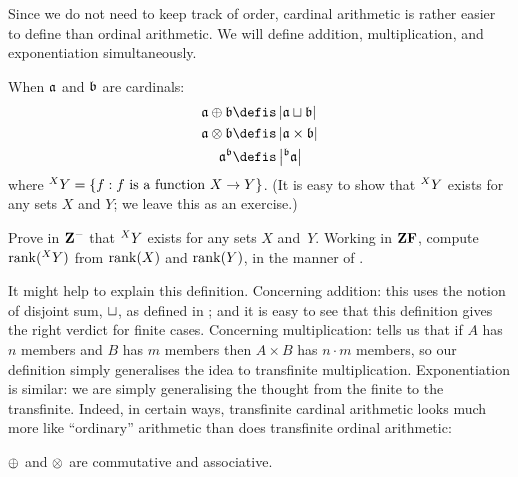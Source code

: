 \documentclass[../../../include/open-logic-section]{subfiles}
\begin{document}

Since we do not need to keep track of order, cardinal arithmetic is
rather easier to define than ordinal arithmetic. We will define
addition, multiplication, and exponentiation simultaneously. 

\begin{defn}
When $\mathfrak{a}$ and $\mathfrak{b}$ are cardinals:
\begin{align*}
	\cardfont{a} \cardplus \cardfont{b} &\defis 
	\card{\cardfont{a} \disjointsum \cardfont{b}}\\
	\cardfont{a} \cardtimes \cardfont{b} &\defis 
	\card{\cardfont{a} \times \cardfont{b}}\\
	\cardexpo{\cardfont{a}}{\cardfont{b}} &\defis 
	\card{\funfromto{\cardfont{b}}{\cardfont{a}}}
\end{align*}
where ${}^{X}{Y} = \{ f : f \text{ is a function } X \to Y \}$.
(It is easy to show that ${}^{X}{Y}$ exists for any sets $X$
and $Y$; we leave this as an exercise.) 
\end{defn}

\begin{prob}
Prove in $\mathbf{Z}^{-}$ that ${}^{X}{Y}$ exists for any sets $X$
and~$Y$. Working in $\mathbf{ZF}$, compute $\mathrm{rank}({}^{X}{Y})$ from
$\mathrm{rank}(X)$ and $\mathrm{rank}(Y)$, in the manner of
. 
\end{prob}

It might help to explain this definition. Concerning addition: this
uses the notion of disjoint sum, $\sqcup$, as defined in
; and it is easy
to see that this definition gives the right verdict for finite cases.
Concerning multiplication:  tells us
that if $A$ has $n$ members and $B$ has $m$ members then $A \times B$
has $n \cdot m$ members, so our definition simply generalises the idea
to transfinite multiplication. Exponentiation is similar: we are
simply generalising the thought from the finite to the transfinite.
Indeed, in certain ways, transfinite cardinal arithmetic looks much
more like ``ordinary'' arithmetic than does transfinite ordinal
arithmetic:

\begin{prop}
$\oplus$ and $\otimes$ are commutative and associative. 
\end{prop}
\end{document}
